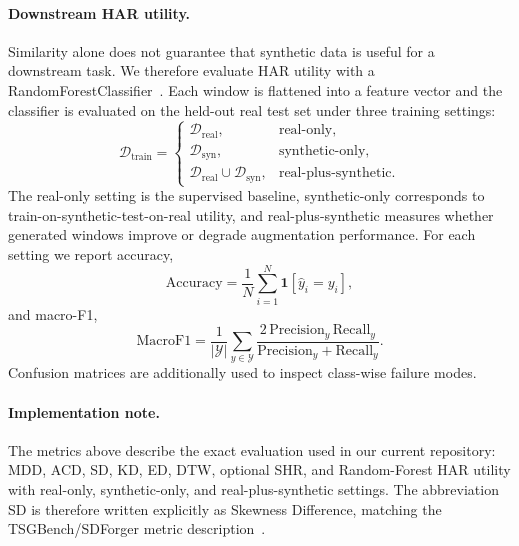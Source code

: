 \paragraph{Downstream HAR utility.}
Similarity alone does not guarantee that synthetic data is useful for a
downstream task. We therefore evaluate HAR utility with a
RandomForestClassifier~\cite{breiman2001randomforest}. Each window is flattened
into a feature vector and the classifier is evaluated on the held-out real test
set under three training settings:
\begin{equation}
    \mathcal{D}_{\mathrm{train}}=
    \begin{cases}
    \mathcal{D}_{\mathrm{real}}, & \text{real-only},\\
    \mathcal{D}_{\mathrm{syn}}, & \text{synthetic-only},\\
    \mathcal{D}_{\mathrm{real}}\cup\mathcal{D}_{\mathrm{syn}},
    & \text{real-plus-synthetic}.
    \end{cases}
\end{equation}
The real-only setting is the supervised baseline, synthetic-only corresponds to
train-on-synthetic-test-on-real utility, and real-plus-synthetic measures whether
generated windows improve or degrade augmentation performance. For each setting
we report accuracy,
\begin{equation}
    \mathrm{Accuracy}=
    \frac{1}{N}\sum_{i=1}^{N}\mathbf{1}[\hat{y}_i=y_i],
\end{equation}
and macro-F1,
\begin{equation}
    \mathrm{MacroF1}=
    \frac{1}{|\mathcal{Y}|}
    \sum_{y\in\mathcal{Y}}
    \frac{2\,\mathrm{Precision}_y\,\mathrm{Recall}_y}
    {\mathrm{Precision}_y+\mathrm{Recall}_y}.
\end{equation}
Confusion matrices are additionally used to inspect class-wise failure modes.

\paragraph{Implementation note.}
The metrics above describe the exact evaluation used in our current repository:
MDD, ACD, SD, KD, ED, DTW, optional SHR, and Random-Forest HAR utility with
real-only, synthetic-only, and real-plus-synthetic settings. The abbreviation SD
is therefore written explicitly as Skewness Difference, matching the
TSGBench/SDForger metric description~\cite{ang2023tsgbench,rousseau2025sdforger}.

